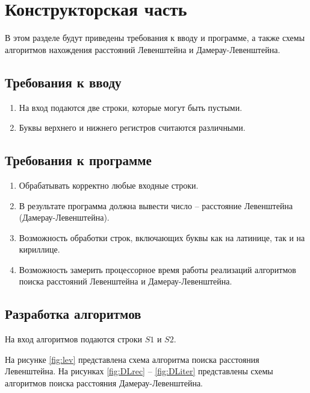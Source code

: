 \chapter{Конструкторская часть}

В этом разделе будут приведены требования к вводу и программе, а также схемы алгоритмов нахождения расстояний Левенштейна и Дамерау-Левенштейна.

\section{Требования к вводу}
\begin{enumerate}
	\item На вход подаются две строки, которые могут быть пустыми.
	\item Буквы верхнего и нижнего регистров считаются различными.
\end{enumerate}

\section{Требования к программе}
\begin{enumerate}
	\item Обрабатывать корректно любые входные строки.
	\item В результате программа должна вывести число -- расстояние Левенштейна (Дамерау-Левенштейна).
	\item Возможность обработки строк, включающих буквы как на латинице, так и на кириллице.
	\item Возможность замерить процессорное время работы реализаций алгоритмов поиска расстояний Левенштейна и Дамерау-Левенштейна.
\end{enumerate}


\section{Разработка алгоритмов}

На вход алгоритмов подаются строки $S1$ и $S2$.

На рисунке \ref{fig:lev} представлена схема алгоритма поиска расстояния Левенштейна. На рисунках \ref{fig:DLrec} -- \ref{fig:DLiter} представлены схемы алгоритмов поиска расстояния Дамерау-Левенштейна.

